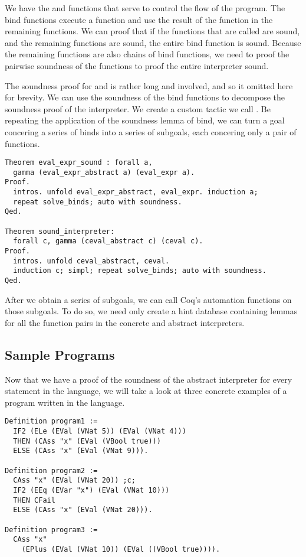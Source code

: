 We have the  and  functions that 
serve to control the flow of the program. The bind functions execute a function
and use the result of the function in the remaining functions. We can proof
that if the functions that are called are sound, and the remaining functions
are sound, the entire bind function is sound. Because the remaining functions
are also chains of bind functions, we need to proof the pairwise soundness of 
the functions to proof the entire interpreter sound.

The soundness proof for  and  is
rather long and involved, and so it omitted here for brevity. We can use the
soundness of the bind functions to decompose the soundness proof of the
interpreter. We create a custom tactic we call . Be repeating
the application of the soundness lemma of bind, we can turn a goal concering a
series of binds into a series of subgoals, each concering only a pair of
functions.

\begin{verbatim}
Theorem eval_expr_sound : forall a,
  gamma (eval_expr_abstract a) (eval_expr a).
Proof.
  intros. unfold eval_expr_abstract, eval_expr. induction a; 
  repeat solve_binds; auto with soundness. 
Qed.

Theorem sound_interpreter:
  forall c, gamma (ceval_abstract c) (ceval c).
Proof.
  intros. unfold ceval_abstract, ceval. 
  induction c; simpl; repeat solve_binds; auto with soundness.
Qed.
\end{verbatim}

After we obtain a series of subgoals, we can call Coq's automation functions on
those subgoals. To do so, we need only create a hint database containing lemmas
for all the function pairs in the concrete and abstract interpreters.

\subsection{Sample Programs}
Now that we have a proof of the soundness of the abstract interpreter for every
statement in the language, we will take a look at three concrete examples of a
program written in the language. 

\begin{verbatim}
Definition program1 := 
  IF2 (ELe (EVal (VNat 5)) (EVal (VNat 4))) 
  THEN (CAss "x" (EVal (VBool true))) 
  ELSE (CAss "x" (EVal (VNat 9))).

Definition program2 :=
  CAss "x" (EVal (VNat 20)) ;c;
  IF2 (EEq (EVar "x") (EVal (VNat 10)))
  THEN CFail
  ELSE (CAss "x" (EVal (VNat 20))).

Definition program3 :=
  CAss "x" 
  	(EPlus (EVal (VNat 10)) (EVal ((VBool true)))).
\end{verbatim}

